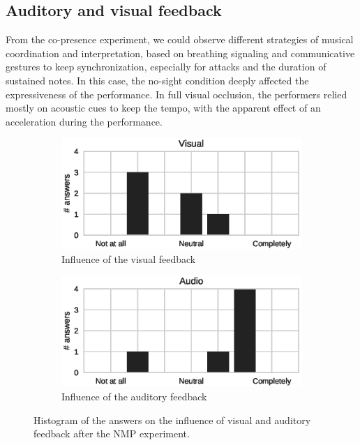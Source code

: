 \subsection{Auditory and visual feedback}
From the co-presence experiment, we could observe different strategies of musical coordination and interpretation, based on breathing signaling and communicative gestures to keep synchronization, especially for attacks and the duration of sustained notes. In this case, the no-sight condition deeply affected the expressiveness of the performance. In full visual occlusion, the performers relied mostly on acoustic cues to keep the tempo, with the apparent effect of an acceleration during the performance. 

\begin{figure}[t]
	\centering
	\begin{subfigure}[t]{.48\columnwidth}
		\centering        
		\includegraphics[trim={.5cm 0cm 1cm 0cm},clip,width=\textwidth]{img/Visual}
		\caption{Influence of the visual feedback}
		\label{subfig:visual}
	\end{subfigure}
	\begin{subfigure}[t]{.48\columnwidth}
		\centering        
		\includegraphics[trim={1.5cm 0cm 0cm 0cm},clip,width=\textwidth]{img/Audio}
		\caption{Influence of the auditory feedback}
		\label{subfig:audio}
	\end{subfigure}
	\quad 
	\caption{Histogram of the answers on the influence of visual and auditory feedback after the NMP experiment.}\label{fig:va}
\end{figure}  

